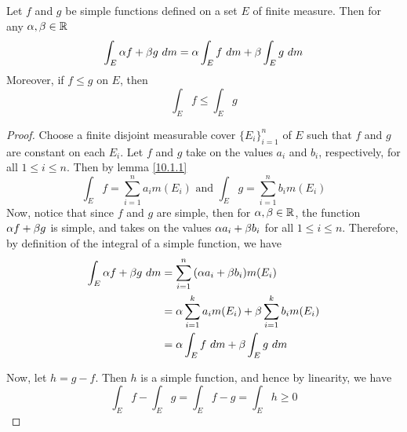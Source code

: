 \begin{lemma}\label{10.1.2}
    Let $f$ and  $g$ be simple functions defined on a set  $E$ of finite
    measure. Then for any  $\alpha,\beta \in \mathbb{R}$
    \begin{equation*}
        \int_E{\a{f}+\b{g} \ dm}=\a\int_E{f \ dm}+\b\int_E{g \ dm}
    \end{equation*}
    Moreover, if $f \leq g$ on  $E$, then
    \begin{equation*}
        \int_E{f} \leq \int_E{g}
    \end{equation*}
\end{lemma}
\begin{proof}
    Choose a finite disjoint measurable cover $\{E_i\}_{i=1}^n$ of $E$ such that
     $f$ and  $g$ are constant on each  $E_i$. Let  $f$ and  $g$ take on the
     values  $a_i$ and  $b_i$, respectively, for all  $1 \leq i \leq n$. Then by
     lemma \ref{10.1.1}
     \begin{equation*}
         \int_E{f}=\sum_{i=1}^n{a_im(E_i)} \text{ and }
         \int_E{g}=\sum_{i=1}^n{b_im(E_i)}
     \end{equation*}
     Now, notice that since $f$ and  $g$ are simple, then for  $\alpha,\beta \in \mathbb{R}$,
     the function  $\alpha{f}+\beta{g}$ is simple, and takes on the values
     $\alpha{a_i}+\beta{b_i}$ for all $1 \leq i \leq n$. Therefore, by definition of
     the integral of a simple function, we have
     \begin{align*}
         \int_E{\a{f}+\b{g} \ dm}    &= \sum_{i=1}^n{(\a{a_i}+\b{b_i})m(E_i)} \\
                                  &=  \a\sum_{i=1}^k{a_im(E_i)}+
                                        \b\sum_{i=1}^k{b_im(E_i)}   \\
                                  &=  \a\int_E{f \ dm}+\b\int_E{g \ dm} \\
     \end{align*}

     Now, let $h=g-f$. Then  $h$ is a simple function, and hence by linearity,
     we have
     \begin{equation*}
         \int_E{f}-\int_E{g}=\int_E{f-g}=\int_E{h} \geq 0
     \end{equation*}
\end{proof}

